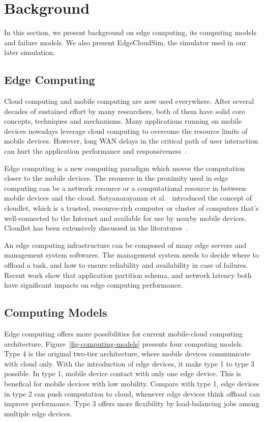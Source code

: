 \section{Background}
\label{sec:background}

In this section, we present background on edge computing, its computing models and failure models.
We also present EdgeCloudSim, the simulator used in our later simulation.

\subsection{Edge Computing}
Cloud computing and mobile computing are now used everywhere.
After several decades of sustained effort by many researchers, both of them have
solid core concepts, techniques and mechanisms. Many applications running on mobile devices nowadays
leverage cloud computing to overcome the resource limits of mobile devices. However,
long WAN delays in the critical path of user interaction can hurt the application
performance and responsiveness~\cite{cloudlets09}.

Edge computing is a new computing paradigm which moves the computation closer to the mobile devices.
The reousrce in the proximity used in edge computing can be a network resource or a computational resource
in between mobile devices and the cloud. Satyanarayanan et al.~\cite{cloudlets09} introduced the concept
of cloudlet, which is a trusted, resource-rich computer or cluster of computers that's well-connected to
the Internet and available for use by nearby mobile devices. Cloudlet has been extensively discussed in the
literatures~\cite{edge-computing, Cloudlets12,hu-apsys16,ChaufournierSLN17}.

An edge computing infrastructure can be composed of many edge servers and management system softwares.
The management system needs to decide where to offload a task, and how to ensure reliability and availability
in case of failures. Recent work \cite{hu-apsys16,COMET} show that application partition schema, and network latency
both have significant impacts on edge computing performance.




\subsection{Computing Models}
\label{sec:computing-models}
Edge computing offers more possibilities for current mobile-cloud computing architecture.
Figure~\ref{fig-computing-models} presents four computing models. Type 4 is the original
two-tier architecture, where mobile devices communicate with cloud only. With the introduction of
edge devices, it make type 1 to type 3 possible. In type 1, mobile device contact with only one edge device.
This is benefical for mobile devices with low mobility. Compare with type 1, edge devices in type 2 can
push computation to cloud, whenever edge devices think offload can improve performance. Type 3 offers
more flexibility by load-balancing jobs among multiple edge devices.

